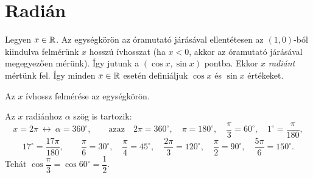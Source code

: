 \documentclass[11pt]{article}
\begin{document}
\section{Radián}

\begin{defbox}
\begin{definition}[Radián]
Legyen $x\in\mathbb{R}$. Az egységkörön az óramutató járásával ellentétesen az $(1, 0)$-ból kiindulva felmérünk $x$ hosszú ívhosszat (ha $x<0$, akkor az óramutató járásával megegyezően mérünk). Így jutunk a $(\cos x, \sin x)$ pontba. Ekkor $x$ \emph{radiánt} mértünk fel. Így minden $x\in\mathbb{R}$ esetén definiáljuk $\cos x$ és $\sin x$ értékeket.
\end{definition}
\end{defbox}

\begin{notefig}{Az $x$ ívhossz felmérése az egységkörön.}
\end{notefig}

Az $x$ radiánhoz $\alpha$ szög is tartozik:
\[
x=2\pi \ \longleftrightarrow\ \alpha=360^{\circ},\qquad \text{azaz}\quad
2\pi=360^{\circ},\quad \pi=180^{\circ},\quad \frac{\pi}{3}=60^{\circ},\quad
1^{\circ}=\frac{\pi}{180},
\]
\[
17^{\circ}=\frac{17\pi}{180},\qquad
\frac{\pi}{6}=30^{\circ},\quad \frac{\pi}{4}=45^{\circ},\quad
\frac{2\pi}{3}=120^{\circ},\quad \frac{\pi}{2}=90^{\circ},\quad
\frac{5\pi}{6}=150^{\circ}.
\]
Tehát $\cos\dfrac{\pi}{3}=\cos 60^{\circ}=\dfrac{1}{2}$.
\end{document}
